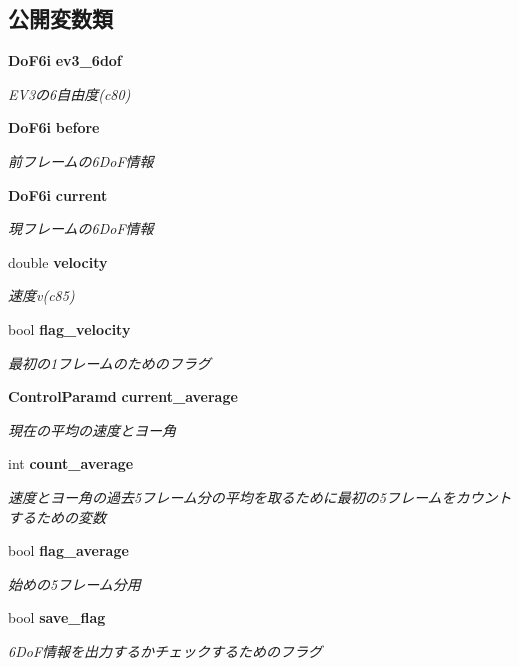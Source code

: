 \subsection*{公開変数類}
\begin{DoxyCompactItemize}
\item 
{\bf Do\-F6i} {\bf ev3\-\_\-6dof}
\begin{DoxyCompactList}\small\item\em E\-V3の6自由度(c80) \end{DoxyCompactList}\item 
{\bf Do\-F6i} {\bf before}
\begin{DoxyCompactList}\small\item\em 前フレームの6\-Do\-F情報 \end{DoxyCompactList}\item 
{\bf Do\-F6i} {\bf current}
\begin{DoxyCompactList}\small\item\em 現フレームの6\-Do\-F情報 \end{DoxyCompactList}\item 
double {\bf velocity}
\begin{DoxyCompactList}\small\item\em 速度v(c85) \end{DoxyCompactList}\item 
bool {\bf flag\-\_\-velocity}
\begin{DoxyCompactList}\small\item\em 最初の1フレームのためのフラグ \end{DoxyCompactList}\item 
{\bf Control\-Paramd} {\bf current\-\_\-average}
\begin{DoxyCompactList}\small\item\em 現在の平均の速度とヨー角 \end{DoxyCompactList}\item 
int {\bf count\-\_\-average}
\begin{DoxyCompactList}\small\item\em 速度とヨー角の過去5フレーム分の平均を取るために最初の5フレームをカウントするための変数 \end{DoxyCompactList}\item 
bool {\bf flag\-\_\-average}
\begin{DoxyCompactList}\small\item\em 始めの5フレーム分用 \end{DoxyCompactList}\item 
bool {\bf save\-\_\-flag}
\begin{DoxyCompactList}\small\item\em 6\-Do\-F情報を出力するかチェックするためのフラグ \end{DoxyCompactList}\end{DoxyCompactItemize}


